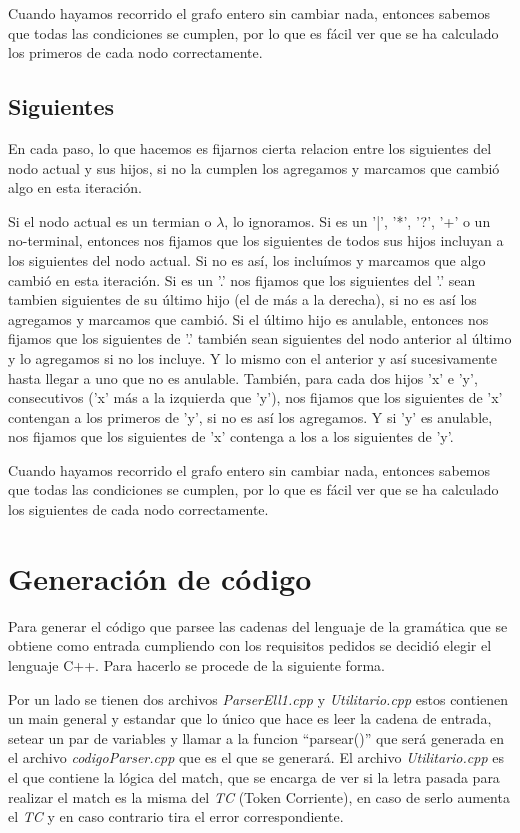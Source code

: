 \documentclass[a4paper]{report}
\begin{document}
	Cuando hayamos recorrido el grafo entero sin cambiar nada, entonces
sabemos que todas las condiciones se cumplen, por lo que es fácil ver que se ha
calculado los primeros de cada nodo correctamente.


\subsection*{Siguientes}

	En cada paso, lo que hacemos es fijarnos cierta relacion entre los
siguientes del nodo actual y sus hijos, si no la cumplen los agregamos y marcamos que
cambió algo en esta iteración.


	Si el nodo actual es un termian o $\lambda$, lo ignoramos. Si es un '|',
'*', '?', '+' o un no-terminal, entonces nos fijamos que los siguientes de todos
sus hijos incluyan a los siguientes del nodo actual. Si no es así, los incluímos
y marcamos que algo cambió en esta iteración. Si es un '.' nos fijamos que los
siguientes del '.' sean tambien siguientes de su último hijo (el de más a la
derecha), si no es así los agregamos y marcamos que cambió. Si el último hijo es
anulable, entonces nos fijamos que los siguientes de '.' también sean siguientes
del nodo anterior al último y lo agregamos si no los incluye. Y lo mismo con el
anterior y así sucesivamente hasta llegar a uno que no es anulable. También,
para cada dos hijos 'x' e 'y', consecutivos ('x' más a la izquierda que 'y'),
nos fijamos que los siguientes de 'x' contengan a los primeros de 'y', si no es
así los agregamos. Y si 'y' es anulable, nos fijamos que los siguientes de 'x'
contenga a los a los siguientes de 'y'.


	Cuando hayamos recorrido el grafo entero sin cambiar nada, entonces
sabemos que todas las condiciones se cumplen, por lo que es fácil ver que se ha
calculado los siguientes de cada nodo correctamente.


\section*{Generación de código}


Para generar el código que parsee las cadenas del lenguaje de la gramática que se 
obtiene como entrada cumpliendo con los requisitos pedidos se decidió elegir el lenguaje C++. Para hacerlo se procede de la siguiente forma.


Por un lado se tienen dos archivos \emph{ParserEll1.cpp} y \emph{Utilitario.cpp} estos contienen un main general y estandar
que lo único que hace es leer la cadena de entrada, setear un par de variables y llamar a la funcion ``parsear()'' 
que será generada en el archivo \emph{codigoParser.cpp} que es el que se generará. El archivo \emph{Utilitario.cpp} 
es el que contiene la lógica del match, que se encarga de ver si la letra pasada para realizar el match es la misma del \emph{TC} 
(Token Corriente), en caso de serlo aumenta el \emph{TC} y en caso contrario tira el error correspondiente.
\end{document}
